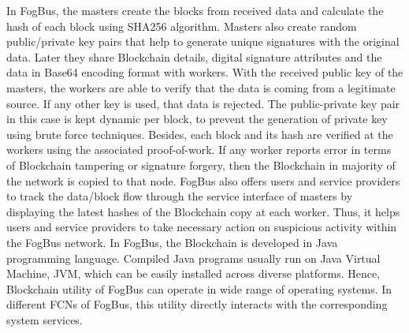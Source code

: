 \documentclass[final,5p,times,twocolumn]{elsarticle}
\begin{document}
\par In FogBus, the masters create the blocks from received data and calculate the hash of each block using SHA256 algorithm. Masters also create random public/private key pairs that help to generate unique signatures with the original data. Later they share Blockchain details, digital signature attributes and the data in Base64 encoding format with workers. With the received public key of the masters, the workers are able to verify that the data is coming from a legitimate source. If any other key is used, that data is rejected. The public-private key pair in this case is kept dynamic per block, to prevent the generation of private key using brute force techniques. Besides, each block and its hash are verified at the workers using the associated proof-of-work. If any worker reports error in terms of Blockchain tampering or signature forgery, then the Blockchain in majority of the network is copied to that node. FogBus also offers users and service providers to track the data/block flow through the service interface of masters by displaying the latest hashes of the Blockchain copy at each worker. Thus, it helps users and service providers to take necessary action on suspicious activity within the FogBus network. In FogBus, the Blockchain is developed in Java programming language. Compiled Java programs usually run on Java Virtual Machine, JVM, which can be easily installed across diverse platforms. Hence, Blockchain utility of FogBus can operate in wide range of operating systems. In different FCNs of FogBus, this utility directly interacts with the corresponding system services.   
%
\par 
\end{document}
